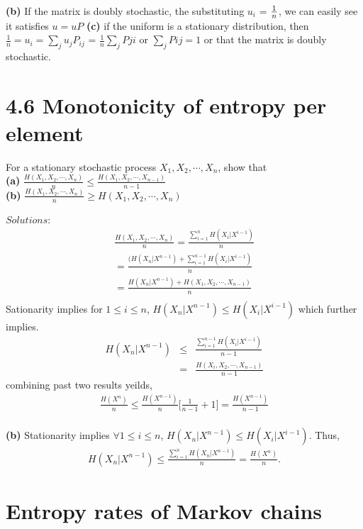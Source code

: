\documentclass[10pt]{article}
\begin{document}
\begin{tiny}
\begin{multicols}{3}
\textbf{(b)} If the matrix is doubly stochastic, the substituting $u_i$ = $1\over{n}$, we can easily see it satisfies $u=uP$
\textbf{(c)} if the uniform is a stationary distribution, then
$\frac{1}{n} = u_i = \sum_{j}u_{j}P_{ij}$ = $ \frac{1}{n}\sum_jP{ji}$ or $\sum_jP{ij}=1$ or that the matrix is doubly stochastic.


\section*{4.6 Monotonicity of entropy per element}
For a stationary stochastic process $X_1, X_2, \cdots , X_n$, show that
\\ \textbf{(a)} $\frac{H(X_1,X_2,\cdots,X_n)}{n} \le \frac{H(X_1,X_2,\cdots,X_{n - 1})}{ n - 1} $
\\ \textbf{(b)} $\frac{H(X_1,X_2,\cdots,X_n)}{n} \ge H(X_1,X_2,\cdots,X_n)$

$Solutions$:
\begin{eqnarray*}
\frac{H(X_1,X_2,\cdots,X_n)}{n} = \frac{\sum_{i=1}^n H(X_i | X^{i-1})}{n} \\ 
= \frac{(H(X_n | X^{n-1}) + \sum_{i=1}^{n-1} H(X_i |X^{i-1}) } {n} \\ 
= \frac{H(X_n | X^{n-1}) + H(X_1,X_2,\cdots,X_{n-1}) } {n} \\
\end{eqnarray*}
Sationarity implies for $1\le i \le n$, $H(X_n | X^{n-1}) \le H(X_i | X^{i-1}) $
which further implies.
\begin{eqnarray*}
H(X_n | X^{n-1}) &\le& \frac{ \sum_{i=1}^{n-1} H(X_i | X^{i-1})} {n-1} \\
&=& \frac{ H(X_i,X_2,\cdots,X_{n-1})} {n-1}
\end{eqnarray*}
combining past two results yeilds, 
\begin{eqnarray*}
\frac{H(X^n)}{n} \leq \frac{H(X^{n-1})}{n} \bigg[ \frac{ 1 } {n-1}  + 1 \bigg]
= \frac{H(X^{n-1})}{n-1}
\end{eqnarray*}
\\
\textbf{(b)} Stationarity implies $\forall 1 \leq i \leq n$, $H(X_n |
X^{n-1} ) \leq H(X_i | X^{i-1})$. Thus,
\begin{eqnarray*}
H(X_n | X^{n-1}) \leq \frac{\sum_{i=1}^n H(X_n | X^{n-1}) } {n}
= \frac{H(X^n)}{n}.
\end{eqnarray*}


\section*{Entropy rates of Markov chains}


\end{multicols}
\end{tiny}
\end{document}
